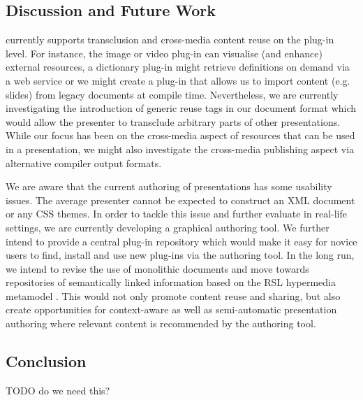    \subsection{Discussion and Future Work}

    \mxp currently supports transclusion and cross-media content reuse on the
    plug-in level. For instance, the image or video plug-in can visualise (and
    enhance) external resources, a dictionary plug-in might retrieve
    definitions on demand via a web service or we might create a plug-in that
    allows us to import content (e.g. \ppt slides) from legacy documents at
    compile time. Nevertheless, we are currently investigating the introduction
    of generic reuse tags in our document format which would allow the
    presenter to transclude arbitrary parts of other \mxp presentations. While
    our focus has been on the cross-media aspect of resources that can be used
    in a presentation, we might also investigate the cross-media publishing
    aspect via alternative compiler output formats.

    We are aware that the current authoring of \mxp presentations has some
    usability issues. The average presenter cannot be expected to construct an
    XML document or any CSS themes. In order to tackle this issue and further
    evaluate \mxp in real-life settings, we are currently developing a
    graphical \mxp authoring tool. We further intend to provide a central
    plug-in repository which would make it easy for novice users to find,
    install and use new plug-ins via the authoring tool. In the long run, we
    intend to revise the use of monolithic documents and move towards
    repositories of semantically linked information based on the RSL hypermedia
    metamodel \citep{signer-3}. This would not only promote content reuse and
    sharing, but also create opportunities for context-aware as well as
    semi-automatic presentation authoring where relevant content is recommended
    by the authoring tool.

   \subsection{Conclusion}

    TODO do we need this?
   
